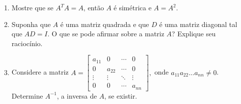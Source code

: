 \documentclass{report}
\begin{document}
\begin{Exercise}
\begin{enumerate}
\item \label{1lista20} Mostre que se $A^{T}A=A$, então $A$ é
simétrica e $A=A^{2}$.



\item \label{1lista21} Suponha que $A$ é uma matriz quadrada e que
$D$ é uma matriz diagonal tal que $AD=I$. O que se pode afirmar
sobre a matriz $A$? Explique seu raciocínio.





\item \label{1lista22}  Considere a matriz $A=\left[
\begin{array}{cccc}
a_{11} & 0 & \cdots  & 0 \\
0 & a_{22} & \cdots  & 0 \\
\vdots  & \vdots  & \ddots  & \vdots  \\
0 & 0 & \cdots  & a_{nn}
\end{array}
\right],$ onde $a_{11}a_{22}...a_{nn}\neq 0$. Determine $A^{-1}$,
a inversa de $A$, se existir.






\end{enumerate}
\end{Exercise}
\end{document}
